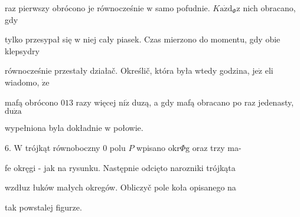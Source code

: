 \documentclass[a4paper,12pt]{article}
\begin{document}
raz pierwszy obrócono je równocześnie $\mathrm{w}$ samo pofudnie. $K\mathrm{a}\dot{\mathrm{z}}\mathrm{d}_{\Phi}\mathrm{z}$ nich obracano, gdy

tylko przesypał się $\mathrm{w}$ niej cały piasek. Czas mierzono do momentu, gdy obie klepsydry

równocześnie przestały działač. Określič, która była wtedy godzina, $\mathrm{j}\mathrm{e}\dot{\mathrm{z}}$ eli wiadomo, $\dot{\mathrm{z}}\mathrm{e}$

mafą obrócono $013$ razy więcej $\mathrm{n}\mathrm{i}\dot{\mathrm{z}}$ duzą, a gdy mafą obracano po raz jedenasty, $\mathrm{d}\mathrm{u}\dot{\mathrm{z}}\mathrm{a}$

wypełniona byla dokładnie $\mathrm{w}$ połowie.

6. $\mathrm{W}$ trójkąt równoboczny $0$ polu $P$ wpisano $\mathrm{o}\mathrm{k}\mathrm{r}\Phi \mathrm{g}$ oraz trzy ma-

fe okręgi - jak na rysunku. Następnie odcięto narozniki trójkąta

wzdłuz łuków małych okregów. Obliczyč pole koła opisanego na

tak powstalej figurze.
\end{document}

